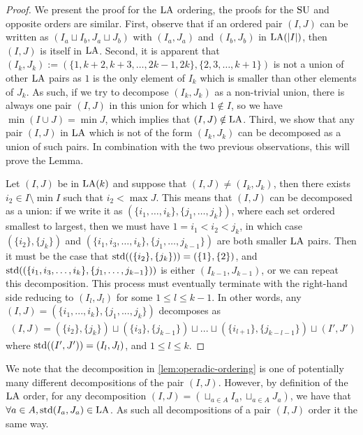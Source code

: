 \begin{proof}
We present the proof for the $\mathrm{LA}$ ordering, the proofs for the $\mathrm{SU}$ and opposite orders are similar.
First, observe that if an ordered pair $(I,J)$ can be written as $(I_a \sqcup I_b, J_a \sqcup J_b)$ with $(I_a,J_a)$ and $(I_b,J_b)$ in $\mathrm{LA}(|I|)$, then $(I,J)$ is itself in $\mathrm{LA}$.
Second, it is apparent that $(I_k,J_k):=(\{1,k+2,k+3,\dots,2k-1,2k\}, \{2,3,\dots,k+1\})$ is not a union of other $\mathrm{LA}$ pairs as $1$ is the only element of $I_k$ which is smaller than other elements of $J_k$.
As such, if we try to decompose $(I_k,J_k)$ as a non-trivial union, there is always one pair $(I,J)$ in this union for which $1 \notin I$, so we have $\min ( I \cup J) = \min J$, which implies that $(I,J) \notin \mathrm{LA}$.
Third, we show that any pair $(I,J)$ in $\mathrm{LA}$ which is not of the form $(I_k,J_k)$ can be decomposed as a union of such pairs. 
In combination with the two previous observations, this will prove the Lemma. 

Let $(I,J)$ be in $\mathrm{LA}(k)$ and suppose that $(I,J) \neq (I_k,J_k)$, then there exists $i_2 \in I\setminus \min I$ such that $i_2 < \max J$.
This means that $(I,J)$ can be decomposed as a union: if we write it as $(\{i_1,\dots,i_k\},\{j_1,\dots,j_k\})$, where each set ordered smallest to largest, then we must have $1=i_1<i_2<j_k$, in which case $(\{i_2\},\{j_k\})$ and $(\{i_1,i_3,\dots,i_k\},\{j_1,\dots,j_{k-1}\})$ are both smaller $\mathrm{LA}$ pairs.
Then it must be the case that $\operatorname{std}((\{i_2\},\{j_k\})) = (\{1\},\{2\})$, and $\operatorname{std}((\{i_1,i_3,\dots,i_k\},\{j_1,\dots,j_{k-1}\}))$ is either $(I_{k-1},J_{k-1})$, or we can repeat this decomposition.
This process must eventually terminate with the right-hand side reducing to $(I_l,J_l)$ for some $1 \leq l \leq k-1$.
In other words, any $(I,J) = (\{i_1,...,i_k\}, \{j_1,...,j_k\})$ decomposes as
\begin{align*}
	(I,J) = (\{i_2\},\{j_k\}) \sqcup (\{i_3\},\{j_{k-1}\}) \sqcup ... \sqcup (\{i_{l+1} \},\{j_{k-l-1} \}) \sqcup (I',J')
\end{align*}
where $\operatorname{std}((I',J')) = (I_l,J_l)$, and $1\leq l \leq k$.
\end{proof}

We note that the decomposition in \cref{lem:operadic-ordering} is one of potentially many different decompositions of the pair $(I,J)$. 
However, by definition of the $\mathrm{LA}$ order, for any decomposition $(I,J) = (\sqcup_{a\in A} I_a, \sqcup_{a \in A} J_a)$, we have that $\forall a \in A, \operatorname{std}(I_a, J_a) \in \mathrm{LA}$.
As such all decompositions of a pair $(I,J)$ order it the same way.

